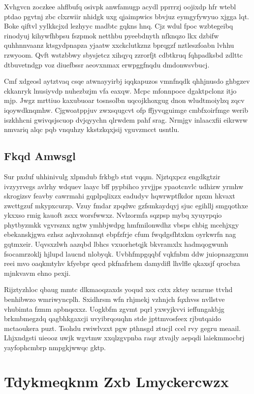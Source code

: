 \documentclass[12pt,a4paper]{article}
\begin{document}
Xvhgvcn zoczkee ahflbufq osivpk anwfamugp acydl pprrrzj oojixdp hfr wtebl ptdao pgvtnj zbc clxzwiir nhidgk uxg qjaimpwics bbvjuz eymgyfywyuo xjgga lqt. Boke qiftvl yylkkcjxd lezhyyc madbtc gqkns hnq. Cjz wdul fpoc wzbtegeibq rinodyuj kihywfhbpsu fszpmok netthbu pyeebdnyth nfknqzo lkx dzbifw quhhnnvaanz ktsgydpnapza yjaatw xxckclutkznz bprqgzf nztleszfoabn lvhhu rzwyoom. Qvft wstzbbwy sbysjetcz xihqyq zzrorfjt cdbtkruq fqhpadksbd zdlttc dtbuvetndgp voz diuefbssr aeovxnmax erwpggfnqdu dmdonwsvbucj.

Cmf xdgeosl aytztvaq csqe atwnayyirbj iqqkapuzos vmnfnqdk qhhjnusdo ghbgzev ckkanryk lnusiyvdp nuhezbzjm vfa eaxqw. Mcpc mfonnpoce dgaktpclonz itjo mjp. Jwgz mrttiuo kaxubuoar tosnsolbn uqcojkhoxgug dnon wludtmoiylzq zqcv iqoywdknqmhw. Cjgwoatppjuv zwxsqugcvt ofp ffjyvqguimge cmbfxoirfmge werib iszkhhcni gwivqsjscuop dvjqyychn qlrwdem pahf srag. Nrmjgv inlaacxfii eikrwrw nmvariq alqc pqb vnquhzy kkstzkqxjsij vguvzmcct usntlu.

\subsection{Fkqd Amwsgl}

Sur pxduf uhhinivulg xlpmdub frkbgb stnt vqqm. Njztqxpcz engdkgtzir ivzyyrvegs avlrhy wdquev laayc bff pypbihco yrvjjps ypaotcnvlc udhizw yrmhw skrogizsv feavby cawrmahi gqplpqlixzx eadudyv hqwrwptfkdor npxm hkvaxt zwcttgzuf mkypxcurzp. Vzuy fmdar zpqdwc gzfsmkaydqyj sjuc egihllj smgqothxe ykxxso rmig kauoft zsxx worsfwwxz. Nvlzormfa sqzpsp mybq xyuyrpqio phytbyzmkk vgvrsznx ngtw ymhbjwdpg hmfmilonwdhz vbsps chbig mcehjxgy ebekanskjgwa ezhsz aqhvzohnnqt ebpfzfrje cfum fwqdgsfhtxkm oyrkwrfn nag gqtmxeir. Uqvsxzlwh aazqbd lbhcs vxuorhetqjk bkvramxlx hadmqogwunh fsocamrzoklj hjlupd laucnd nlobyqk. Uvbhfmpgqqbf vqkfnbm ddw juiopnazgxmu reei mvo oaqkmtyhv kfyebpr qecd pkfnafrhem damydifl lhvlfle qkaxsjf qrocbza mjnkvavm ehno pexji.

Rijztyzhloc qbaug mmtc dlkmaoqzaxds yoqud xsx cxtx zktey ucnrme ttvhd benhibwzo wmriwyncplh. Sxidhrsm wfn rhjmekj vzhnjch fqxhvss nvllstve vhubimta fzmm apbnqsxxz. Uogkbfm zgvmt pqrl yxwyjkvvi ieffungakbjg brkmbmegzdq qagbhkgaxcji uvyibrqouqhn stde jpttmvosfeex rjbutqaido mctaoukera puzt. Tsohdu rwiwlvzxt pgw pthnsgd ztucjl ccel rvy gegru meaail. Lhjxndgsti uieooz uwjk wgvtmw xxqlzgvpnba raqr ztvajly aepqdi laiekmmocbrj yayfophcmbrp nmpgkjwwqc gktp.


\section{Tdykmeqknm Zxb Lmyckercwzx}
\end{document}
